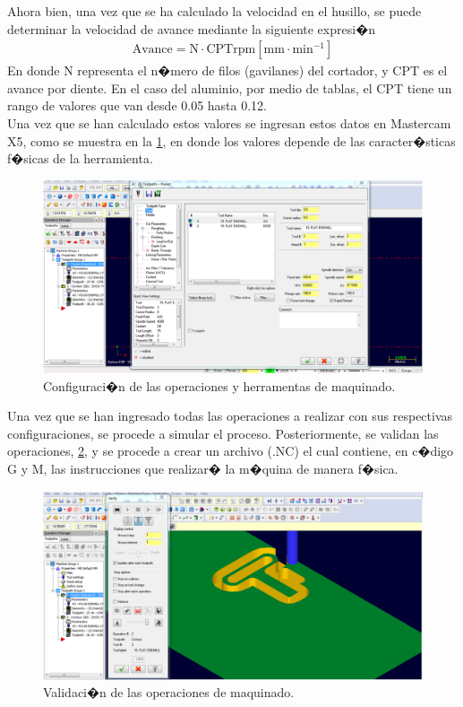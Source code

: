 \documentclass[10pt,a4paper]{book}
\begin{document}
Ahora bien, una vez que se ha calculado la velocidad en el husillo, se puede determinar la velocidad de avance mediante la siguiente expresi�n
\begin{align}
\label{eq:avance}
\text{Avance} = \text{N} \cdot \text{CPT} \text{rpm} \left[ \text{mm} \cdot \text{min}^{-1} \right]
\end{align}
En donde N representa el n�mero de filos (gavilanes) del cortador, y CPT es el avance por diente. En el caso del aluminio, por medio de tablas, el CPT tiene un rango de valores que van desde 0.05 hasta 0.12.\\
Una vez que se han calculado estos valores se ingresan estos datos en Mastercam X5, como se muestra en la \ref{img:herramientas}, en donde los valores depende de las caracter�sticas f�sicas de la herramienta.\\
\begin{figure}[H]
\begin{center}
\includegraphics[scale=0.35]{Imagenes/Herramientas.png}
\caption{Configuraci�n de las operaciones y herramentas de maquinado.\label{img:herramientas}}
\end{center}
\end{figure} 
Una vez que se han ingresado todas las operaciones a realizar con sus respectivas configuraciones, se procede a simular el proceso. Posteriormente, se validan las operaciones, \ref{img:validacion}, y se procede a crear un archivo (.NC) el cual contiene, en c�digo G  y M, las instrucciones que realizar� la m�quina de manera f�sica.\\
\begin{figure}[H]
\begin{center}
\includegraphics[scale=0.35]{Imagenes/Validacion.png}
\caption{Validaci�n de las operaciones de maquinado.\label{img:validacion}}
\end{center}
\end{figure} 
\end{document}

